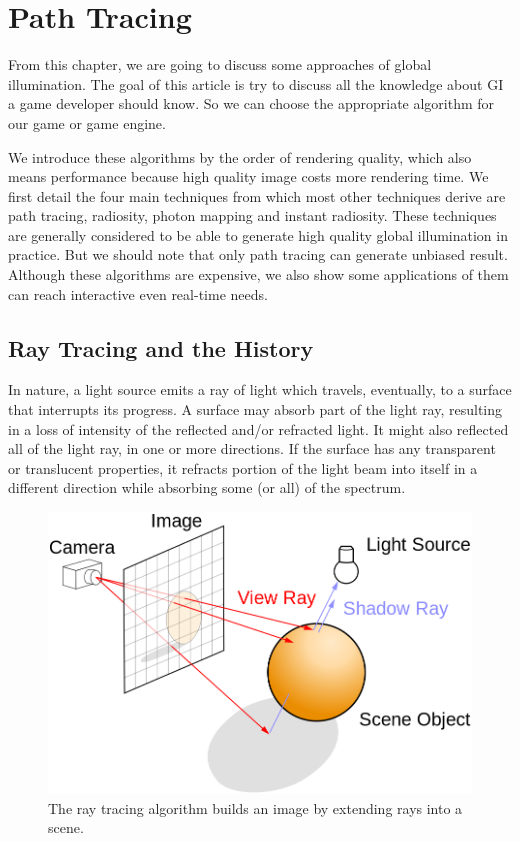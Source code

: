 \chapter{Path Tracing}\label{chp:path-tracing}
From this chapter, we are going to discuss some approaches of global illumination. The goal of this article is try to discuss all the knowledge about GI a game developer should know. So we can choose the appropriate algorithm for our game or game engine.  

We introduce these algorithms by the order of rendering quality, which also means performance because high quality image costs more rendering time. We first detail the four main techniques from which most other techniques derive are path tracing, radiosity, photon mapping and instant radiosity. These techniques are generally considered to be able to generate high quality global illumination in practice. But we should note that only path tracing can generate unbiased result. Although these algorithms are expensive, we also show some applications of them can reach interactive even real-time needs. 



\section{Ray Tracing and the History} 
In nature, a light source emits a ray of light which travels, eventually, to a surface that interrupts its progress. A surface may absorb part of the light ray, resulting in a loss of intensity of the reflected and/or refracted light. It might also reflected all of the light ray, in one or more directions. If the surface has any transparent or translucent properties, it refracts portion of the light beam into itself in a different direction while absorbing some (or all) of the spectrum.

\begin{figure}\label{f:path-tracing}
	\sidecaption
	\includegraphics[width=.65\textwidth]{graphics/gi/path-1}
	\caption{The ray tracing algorithm builds an image by extending rays into a scene.}
\end{figure}

